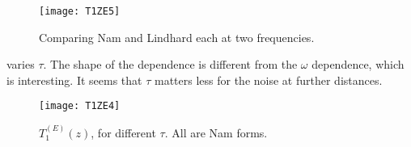 \documentclass[11pt]{article}
\begin{document}
	\begin{figure}[htp]
		\centering
		\texttt{[image: T1ZE5]}
		\caption{
			Comparing Nam and Lindhard each at two frequencies.
		} \label{fig:t5ez}
	\end{figure}

	 varies $\tau$.
	The shape of the dependence is different from the $\omega$ dependence, which is interesting.
	It seems that $\tau$ matters less for the noise at further distances.

	\begin{figure}[htp]
		\centering
		\texttt{[image: T1ZE4]}
		\caption{
			$T_{1}^{(E)}(z)$, for different $\tau$.
			All are Nam forms.
		} \label{fig:t4ez}
	\end{figure}

	\newpage
	\listoftodos
	\newpage
	\printbibliography
\end{document}
